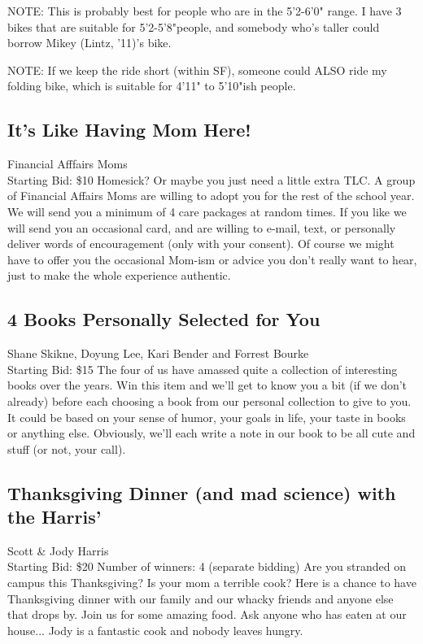 \documentclass[11pt]{article}
\begin{document}
NOTE: This is probably best for people who are in the 5'2-6'0" range. I have 3 bikes that are suitable for 5'2-5'8"people, and somebody who's taller could borrow Mikey (Lintz, '11)'s bike. 

NOTE: If we keep the ride short (within SF), someone could ALSO ride my folding bike, which is suitable for 4'11" to 5'10"ish people.
\subsection{It's Like Having Mom Here!}
Financial Afffairs Moms
\\
Starting Bid: \$10
\newline
Homesick?  Or maybe you just need a little extra TLC.  A group of Financial Affairs Moms are willing to adopt you for the rest of the school year.  We will send you a minimum of 4 care packages at random times.  If you like we will send you an occasional card, and are willing to e-mail, text, or personally deliver words of encouragement (only with your consent).  Of course we might have to offer you the occasional Mom-ism or advice you don’t really want to hear, just to make the whole experience authentic.
\subsection{4 Books Personally Selected for You}
Shane Skikne, Doyung Lee, Kari Bender and Forrest Bourke
\\
Starting Bid: \$15
\newline
The four of us have amassed quite a collection of interesting books over the years. Win this item and we'll get to know you a bit (if we don't already) before each choosing a book from our personal collection to give to you. It could be based on your sense of humor, your goals in life, your taste in books or anything else.  Obviously, we'll each write a note in our book to be all cute and stuff (or not, your call).
\subsection{Thanksgiving Dinner (and mad science) with the Harris'}
Scott \& Jody Harris
\\
Starting Bid: \$20
\newline
Number of winners: 4 (separate bidding)
\newline
Are you stranded on campus this Thanksgiving? Is your mom a terrible cook? Here is a chance to have Thanksgiving dinner with our family and our whacky friends and anyone else that drops by. Join us for some amazing food. Ask anyone who has eaten at our house... Jody is a fantastic cook and nobody leaves hungry.
\end{document}
